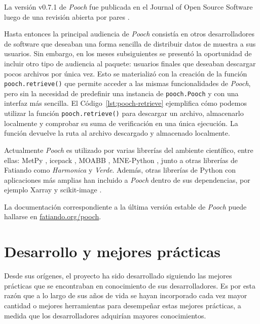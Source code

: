 La versión v0.7.1 de \emph{Pooch} fue publicada en el Journal of Open Source
Software luego de una revisión abierta por pares \citep{pooch2020}.



Hasta entonces la principal audiencia de \emph{Pooch} consistía en otros
desarrolladores de software que deseaban una forma sencilla de distribuir datos
de muestra a sus usuarios.
Sin embargo, en los meses subsiguientes se presentó la oportunidad de incluir
otro tipo de audiencia al paquete: usuarios finales que deseaban descargar
pocos archivos por única vez.
Esto se materializó con la creación de la función \texttt{pooch.retrieve()} que
permite acceder a las mismas funcionalidades de \emph{Pooch}, pero sin la
necesidad de predefinir una instancia de \texttt{pooch.Pooch} y con una
interfaz más sencilla.
El Código~\ref{lst:pooch-retrieve} ejemplifica cómo podemos utilizar la función
\texttt{pooch.retrieve()} para descargar un archivo, almacenarlo localmente
y comprobar su suma de verificación en una única ejecución.
La función devuelve la ruta al archivo descargado y almacenado localmente.

Actualmente \emph{Pooch} es utilizado por varias librerías del ambiente
científico, entre ellas: MetPy \citep{metpy}, icepack \citep{icepack}, MOABB
\citep{moabb}, MNE-Python \citep{mnepython}, junto a otras librerías de
Fatiando como \emph{Harmonica} y \emph{Verde}.
Además, otras librerías de Python con aplicaciones más amplias han incluido
a \emph{Pooch} dentro de sus dependencias, por ejemplo Xarray
\citep{xarray2017} y scikit-image \citep{skimage}.

La documentación correspondiente a la última versión estable de \emph{Pooch}
puede hallarse en \href{https://www.fatiando.org/pooch}{fatiando.org/pooch}.


\section{Desarrollo y mejores prácticas}
\label{sec:best-practices}

Desde sus orígenes, el proyecto ha sido desarrollado siguiendo las mejores
prácticas que se encontraban en conocimiento de sus desarrolladores.
Es por esta razón que a lo largo de sus años de vida se hayan incorporado cada
vez mayor cantidad o mejores herramientas para desempeñar estas mejores
prácticas, a medida que los desarrolladores adquirían mayores conocimientos.

